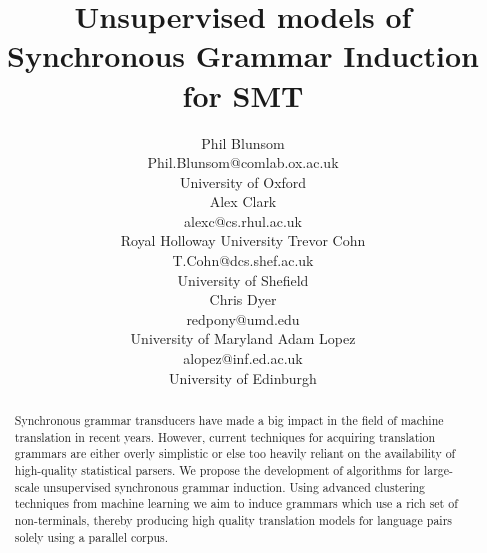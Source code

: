 \documentclass[10pt]{article}
\title{Unsupervised models of Synchronous Grammar Induction for SMT}
\author{
  Phil Blunsom\\ 
  Phil.Blunsom@comlab.ox.ac.uk\\
  University of Oxford\\
 \And
  Alex Clark\\
  alexc@cs.rhul.ac.uk\\
  Royal Holloway University
 \And
  Trevor Cohn\\
  T.Cohn@dcs.shef.ac.uk\\
  University of Shefield
\\
 \AND
  Chris Dyer\\
  redpony@umd.edu\\
  University of Maryland
 \And
  Adam Lopez\\
  alopez@inf.ed.ac.uk\\
  University of Edinburgh 
}
\begin{document}
\maketitle

\begin{abstract}
Synchronous grammar transducers have made a big impact in the field of machine translation in recent years. 
However, current techniques for acquiring translation grammars are either overly simplistic or else too heavily reliant on the availability of high-quality statistical parsers.
We propose the development of algorithms for large-scale unsupervised synchronous grammar induction. 
Using advanced clustering techniques from machine learning we aim to induce grammars which use a rich set of non-terminals, %
thereby producing high quality translation models for language pairs solely using a parallel corpus. %
\end{abstract}

\end{document}
